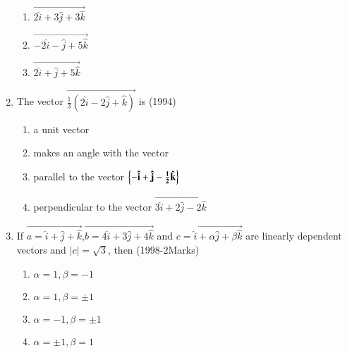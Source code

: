 \documentclass[journal,12pt,twocolumn]{IEEEtran}
\theoremstyle{remark}
\begin{document}
\begin{enumerate}
\begin{enumerate}
			\item $\vec{2\hat{i}+3\hat{j}+3\hat{k}}$
			\item $\vec{-2\hat{i}-\hat{j}+5\hat{k}}$
			\item $\vec{2\hat{i}+\hat{j}+5\hat{k}}$
		\end{enumerate}
\item %
	The vector $\vec{\frac{1}{3}(2\hat{i}-2\hat{j}+\hat{k})}$ is \hfill{(1994)}\\
		\begin{enumerate}
			\item a unit vector
			\item makes an angle with the vector
			\item parallel to the vector $\mathbf{\left\{-\hat{i}+\hat{j}-\frac{1}{2}\hat{k}\right\}}$
			\item perpendicular to the vector $\vec{3\hat{i}+2\hat{j}-2\hat{k}}$
                \end{enumerate}
\item %
	If $\vec{a=\hat{i}+\hat{j}+\hat{k}}$,$\vec{b=4\hat{i}+3\hat{j}+4\hat{k}}$ and $\vec{c=\hat{i}+\alpha\hat{j}+\beta\hat{k}}$ are linearly dependent vectors and $|c|=\sqrt{3}$, then \hfill{(1998-2Marks)}\\
		\begin{enumerate}
			\item $\alpha=1,\beta=-1$
			\item $\alpha=1,\beta=\pm1$
			\item $\alpha=-1,\beta=\pm1$
			\item $\alpha=\pm1,\beta=1$
		\end{enumerate}
\end{enumerate}
\end{document}
